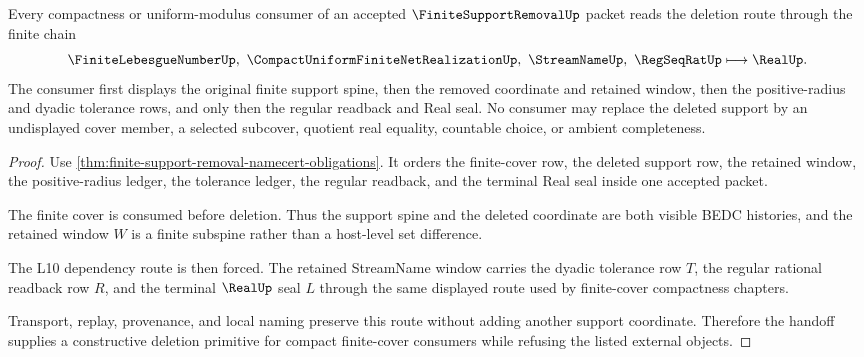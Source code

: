 \begin{theorem}
\label{thm:finite-support-removal-compact-cover-handoff}
Every compactness or uniform-modulus consumer of an accepted $\FiniteSupportRemovalUp$ packet reads the deletion route through the finite chain
$$
\FiniteLebesgueNumberUp,\ \CompactUniformFiniteNetRealizationUp,\ \StreamNameUp,\ \RegSeqRatUp
\longmapsto
\RealUp .
$$
The consumer first displays the original finite support spine, then the removed coordinate and retained window, then the positive-radius and dyadic tolerance rows, and only then the regular readback and Real seal. No consumer may replace the deleted support by an undisplayed cover member, a selected subcover, quotient real equality, countable choice, or ambient completeness.
\end{theorem}
\begin{proof}
Use \autoref{thm:finite-support-removal-namecert-obligations}. It orders the finite-cover row, the deleted support row, the retained window, the positive-radius ledger, the tolerance ledger, the regular readback, and the terminal Real seal inside one accepted packet.

The finite cover is consumed before deletion. Thus the support spine and the deleted coordinate are both visible BEDC histories, and the retained window $W$ is a finite subspine rather than a host-level set difference.

The L10 dependency route is then forced. The retained StreamName window carries the dyadic tolerance row $T$, the regular rational readback row $R$, and the terminal $\RealUp$ seal $L$ through the same displayed route used by finite-cover compactness chapters.

Transport, replay, provenance, and local naming preserve this route without adding another support coordinate. Therefore the handoff supplies a constructive deletion primitive for compact finite-cover consumers while refusing the listed external objects.
\end{proof}



